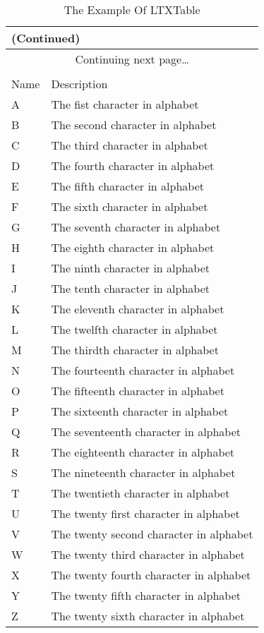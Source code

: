 \begin{longtable}{|X|X|}
    \caption{The Example Of LTXTable} \\
    \hline
    \endfirsthead

    \multicolumn{2}{l}{ (Continued) } \\
    \hline
    \endhead

    \multicolumn{2}{c}{Continuing next page\ldots} \\[2ex]
    \endfoot

    \hline
    \multicolumn{2}{r}{End Of Table} \\
    \endlastfoot

    Name & Description \\ \hline
    A & The fist character in alphabet \\
    B & The second character in alphabet \\
    C & The third character in alphabet \\
    D & The fourth character in alphabet \\
    E & The fifth character in alphabet \\
    F & The sixth character in alphabet \\
    G & The seventh character in alphabet \\
    H & The eighth character in alphabet \\
    I & The ninth character in alphabet \\
    J & The tenth character in alphabet \\
    K & The eleventh character in alphabet \\
    L & The twelfth character in alphabet \\
    M & The thirdth character in alphabet \\
    N & The fourteenth character in alphabet \\
    O & The fifteenth character in alphabet \\
    P & The sixteenth character in alphabet \\
    Q & The seventeenth character in alphabet \\
    R & The eighteenth character in alphabet \\
    S & The nineteenth character in alphabet \\
    T & The twentieth character in alphabet \\
    U & The twenty first character in alphabet \\
    V & The twenty second character in alphabet \\
    W & The twenty third character in alphabet \\
    X & The twenty fourth character in alphabet \\
    Y & The twenty fifth character in alphabet \\
    Z & The twenty sixth character in alphabet \\
\end{longtable}